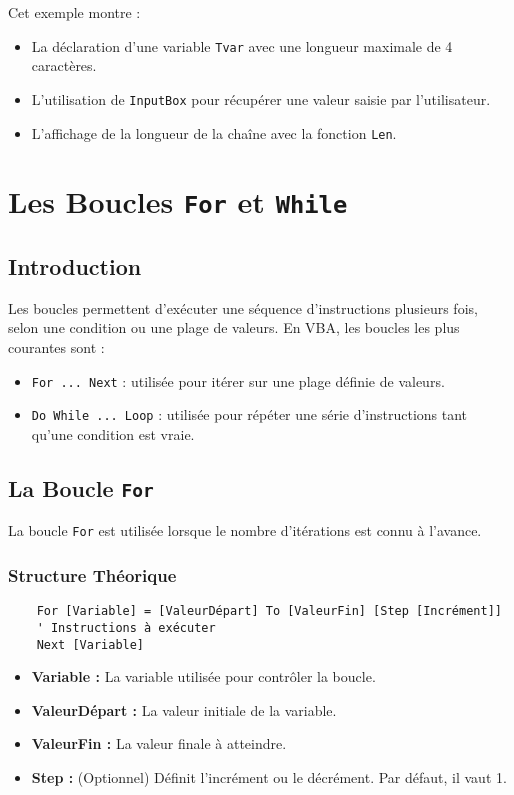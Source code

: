 \documentclass[a4paper,12pt]{report}
\begin{document}
Cet exemple montre :
\begin{itemize}
	\item La déclaration d'une variable \texttt{Tvar} avec une longueur maximale de 4 caractères.
	\item L'utilisation de \texttt{InputBox} pour récupérer une valeur saisie par l'utilisateur.
	\item L'affichage de la longueur de la chaîne avec la fonction \texttt{Len}.
\end{itemize}

\chapter{Les Boucles \texttt{For} et \texttt{While}}

\section{Introduction}
Les boucles permettent d'exécuter une séquence d'instructions plusieurs fois, selon une condition ou une plage de valeurs. En VBA, les boucles les plus courantes sont :
\begin{itemize}
	\item \texttt{For ... Next} : utilisée pour itérer sur une plage définie de valeurs.
	\item \texttt{Do While ... Loop} : utilisée pour répéter une série d'instructions tant qu'une condition est vraie.
\end{itemize}

\section{La Boucle \texttt{For}}
La boucle \texttt{For} est utilisée lorsque le nombre d'itérations est connu à l'avance.

\subsection*{Structure Théorique}
\begin{lstlisting}
	For [Variable] = [ValeurDépart] To [ValeurFin] [Step [Incrément]]
	' Instructions à exécuter
	Next [Variable]
\end{lstlisting}

\begin{itemize}
	\item \textbf{Variable :} La variable utilisée pour contrôler la boucle.
	\item \textbf{ValeurDépart :} La valeur initiale de la variable.
	\item \textbf{ValeurFin :} La valeur finale à atteindre.
	\item \textbf{Step :} (Optionnel) Définit l'incrément ou le décrément. Par défaut, il vaut 1.
\end{itemize}
\end{document}
